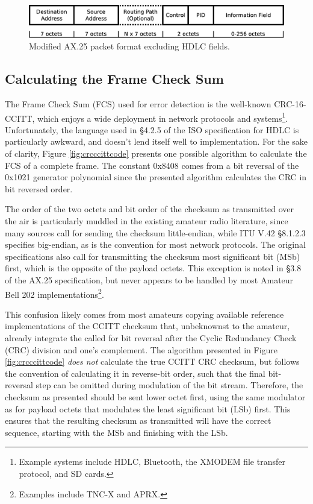 \documentclass[12pt,letterpaper]{article}
\begin{document}
\begin{figure}
	\centering
	\includegraphics[width=1.0\textwidth]{src/dia/ax25}
	\caption{Modified AX.25 packet format excluding HDLC fields.}
	\label{fig:ax25format}
\end{figure}

\subsection{Calculating the Frame Check Sum}
\label{calcfcs}


The Frame Check Sum (FCS) used for error detection is the well-known CRC-16-CCITT, 
which enjoys a wide deployment in network protocols and 
systems\footnote{Example systems include HDLC, Bluetooth, the XMODEM file 
transfer protocol, and SD cards.}.
Unfortunately, the language used in \S4.2.5 of the ISO specification for
HDLC \cite{iso13239} is particularly awkward, 
and doesn't lend itself well to implementation.
For the sake of clarity, Figure \ref{fig:crcccittcode} 
presents one possible algorithm to
calculate the FCS of a complete frame.
The constant 0x8408 comes from a bit reversal of the 0x1021 generator polynomial
since the presented algorithm calculates the CRC in bit reversed order.

The order of the two octets and bit order of the checksum 
as transmitted over the air 
is particularly muddled in the existing amateur radio literature, 
since many sources call for sending the
checksum little-endian, while ITU V.42 \S8.1.2.3 specifies big-endian,
as is the convention for most network protocols.
The original specifications also call for transmitting the checksum most
significant bit (MSb) first, which is the opposite of the payload octets.
This exception is noted in \S3.8 of the AX.25 specification, 
but never appears to be handled by most Amateur Bell 202 
implementations\footnote{Examples include TNC-X and APRX.}.

This confusion likely comes from most amateurs copying
available reference implementations of the CCITT checksum that, 
unbeknownst to the amateur, already integrate the called for bit reversal 
after the Cyclic Redundancy Check (CRC) division and one's complement.
The algorithm presented in Figure \ref{fig:crcccittcode} 
\emph{does not} calculate the true CCITT CRC checksum, but
follows the convention of
calculating it in reverse-bit order, such that the final bit-reversal step 
can be omitted during modulation of the bit stream.
Therefore, the checksum as presented should be sent lower octet first, 
using the same modulator as for payload octets that modulates the 
least significant bit (LSb) first.
This ensures that the resulting checksum as transmitted will have the 
correct sequence, starting with the MSb and finishing with the LSb.
\end{document}
